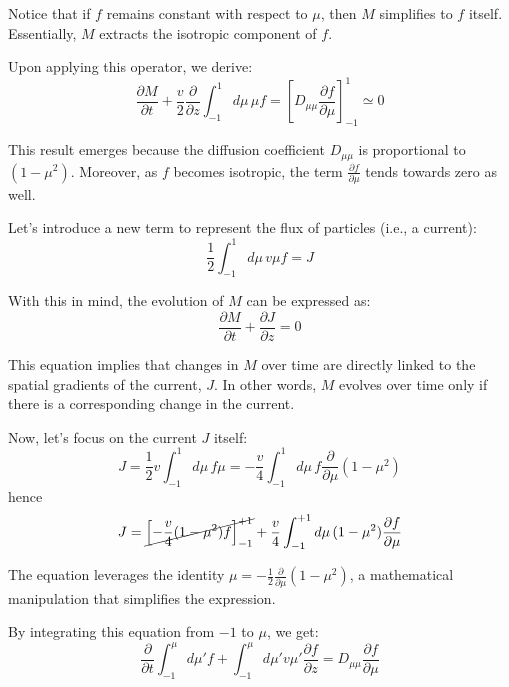 Notice that if \( f \) remains constant with respect to \( \mu \), then \( M \) simplifies to \( f \) itself. Essentially, \( M \) extracts the isotropic component of \( f \).

Upon applying this operator, we derive:
%
\begin{equation}
\frac{\partial M}{\partial t} +\frac{v}{2}\frac{\partial}{\partial z}\int_{-1}^1 d\mu \, \mu f= \left[ {D_{\mu\mu}\frac{\partial f}{\partial \mu}} \right]_{-1}^{1} \simeq 0
\end{equation}

This result emerges because the diffusion coefficient \( D_{\mu\mu} \) is proportional to \( (1-\mu^2) \). Moreover, as \( f \) becomes isotropic, the term \( \frac{\partial f}{\partial \mu} \) tends towards zero as well. 

Let's introduce a new term to represent the flux of particles (i.e., a current):
%
\begin{equation}\label{eq:defj}
\frac{1}{2}\int_{-1}^1 d\mu \, v\mu f = J
\end{equation}

With this in mind, the evolution of \( M \) can be expressed as:
%
\begin{equation}\label{eq:jmcont}
\frac{\partial M}{\partial t} + \frac{\partial J}{\partial z} = 0
\end{equation}

This equation implies that changes in \( M \) over time are directly linked to the spatial gradients of the current, \( J \). In other words, \( M \) evolves over time only if there is a corresponding change in the current.

Now, let's focus on the current \( J \) itself:
%
\begin{equation}
J 
= \frac{1}{2} v\int_{-1}^1 d\mu \, f\mu  
= -\frac{v}{4}\int_{-1}^1 d\mu \, f\frac{\partial}{\partial \mu}(1-\mu^2) 
\end{equation}
%
hence
%
\begin{equation}\label{eq:jpartialmu}
J = \cancel{\left[ -\frac{v}{4}(1-\mu^2)f \right]_{-1}^{+1}} + \frac{v}{4}\int_{-1}^{+1} d\mu \, (1-\mu^2) \frac{\partial f}{\partial \mu}
\end{equation}

The equation leverages the identity \(\mu = -\frac{1}{2}\frac{\partial}{\partial \mu}(1-\mu^2)\), a mathematical manipulation that simplifies the expression.

By integrating this equation from \( -1 \) to \( \mu \), we get:
%
\begin{equation}
\frac{\partial}{\partial t}\int_{-1}^{\mu} d\mu' f +\int_{-1}^{\mu} d\mu' v\mu' \frac{\partial f}{\partial z}=D_{\mu\mu}\frac{\partial f}{\partial \mu}
\end{equation}

